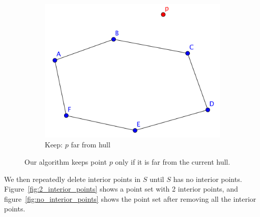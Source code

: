 \begin{figure}[!htb]
\begin{subfigure}[b]{.33\linewidth}
\includegraphics[width=\linewidth]{point_far_outside_hull}
\caption{Keep: $p$ far from hull}\label{fig:point_far_outside_hull}
\end{subfigure}
\caption{Our algorithm keeps point $p$ only if it is far from the current hull.}
\label{fig:when_to_discard_random_order}
\end{figure}

We then repeatedly delete interior points in $S$ until $S$ has no interior points. Figure~\ref{fig:2_interior_points} shows a point set with 2 interior points, and figure~\ref{fig:no_interior_points} shows the point set after removing all the interior points.
\\

